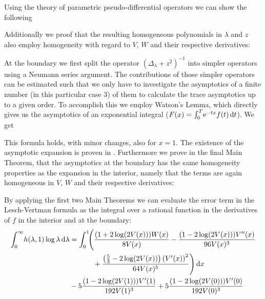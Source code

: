 Using the theory of parametric pseudo-differential operators we can show the
following
\begin{MainTheoremIntro}
  
\end{MainTheoremIntro}
Additionally we proof that the resulting homogeneous polynomials in $\lambda$
and $z$ also employ homogeneity with regard to $V$, $W$ and their respective
derivatives:
\begin{MainTheoremIntro}
  
\end{MainTheoremIntro}
At the boundary we first split the operator $(\Delta_\lambda + z^2)^{-1}$ into
simpler operators using a Neumann series argument. The contributions of those
simpler operators can be estimated such that we only have to investigate the
asymptotics of a finite number (in this particular case 3) of them to calculate
the trace asymptotics up to a given order.
%
To accomplish this we employ Watson's Lemma, which directly gives us the
asymptotics of an exponential integral ($F(x) =
\Integ[T]{0}{t}{\Eto{-tx}f(t)}$). We get
\begin{MainTheoremIntro}
  
\end{MainTheoremIntro}
This formula holds, with minor changes, also for $x=1$. The existence of the
asymptotic expansion is proven in \cite{LV13}.
%
Furthermore we prove in the final Main Theorem, that the asymptotics at the
boundary has the same homogeneity properties as the expansion in the interior,
namely that the terms are again homogeneous in $V$, $W$ and their respective
derivatives:
\begin{MainTheoremIntro}
  
\end{MainTheoremIntro}
By applying the first two Main Theorems we can evaluate the error term in the
Lesch-Vertman formula as the integral over a rational function in the
derivatives of $f$ in the interior and at the boundary:
\begin{align*}
  \Integ[\infty]{0}{\lambda}{
    h(\lambda, 1) \log\lambda
  }
  &=
  \Int{x}{\Biggl(\frac{(1 + 2 \log(2 V(x))) W(x)}{8 V(x)}
    - \frac{ (1 - 2 \log(2 V(x)))V''(x)}{96 V(x)^{3}} \\
    &\hphantom{=\int_0^1\Biggl(}\mathbin{+} \frac{\left(\frac{5}{3} - 2\log(2
    V(x))\right)\left(V'(x)\right)^{2}}{64 V(x)^{5}}\Biggr) } \\
&\mathbin- 5\frac{(1 - 2\log(2 V(1)))V'(1)}{192 V(1)^3}
+ 5\frac{(1 - 2 \log(2 V(0)))V'(0)}{192 V(0)^3}
\end{align*}
